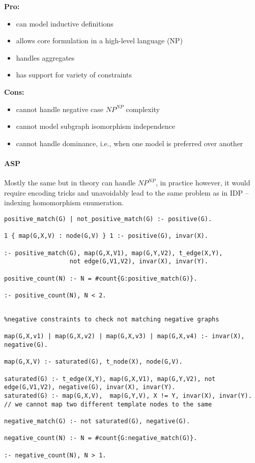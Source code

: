 \documentclass{article}
\theoremstyle{definition}
\begin{document}
\textbf{Pro:}
\begin{itemize}
  \item can model inductive definitions
  \item allows core formulation in a high-level language (NP)
  \item handles aggregates
  \item has support for variety of constraints
\end{itemize}
\textbf{Cons:}
\begin{itemize}
  \item cannot handle negative case $\textit{NP}^\textit{NP}$ complexity
  \item cannot model subgraph isomorphism independence
  \item cannot handle dominance, i.e., when one model is preferred over another 
\end{itemize}

\paragraph{ASP}
Mostly the same but in theory can handle $\textit{NP}^\textit{NP}$, in practice however, it would require encoding tricks and unavoidably lead to the same problem as in IDP -- indexing homomorphism enumeration.

\lstset{basicstyle=\footnotesize\ttfamily,breaklines=true}
\begin{lstlisting}[caption=ASP positive matching]
positive_match(G) | not_positive_match(G) :- positive(G).

1 { map(G,X,V) : node(G,V) } 1 :- positive(G), invar(X).

:- positive_match(G), map(G,X,V1), map(G,Y,V2), t_edge(X,Y), 
                  not edge(G,V1,V2), invar(X), invar(Y).

positive_count(N) :- N = #count{G:positive_match(G)}.

:- positive_count(N), N < 2.
\end{lstlisting}

\begin{lstlisting}[caption=ASP negative matching]
%Saturated Representation

%negative constraints to check not matching negative graphs

map(G,X,v1) | map(G,X,v2) | map(G,X,v3) | map(G,X,v4) :- invar(X), negative(G).

map(G,X,V) :- saturated(G), t_node(X), node(G,V).

saturated(G) :- t_edge(X,Y), map(G,X,V1), map(G,Y,V2), not edge(G,V1,V2), negative(G), invar(X), invar(Y).
saturated(G) :- map(G,X,V),  map(G,Y,V), X != Y, invar(X), invar(Y). // we cannot map two different template nodes to the same 

negative_match(G) :- not saturated(G), negative(G).

negative_count(N) :- N = #count{G:negative_match(G)}.

:- negative_count(N), N > 1.

\end{lstlisting}
\end{document}
